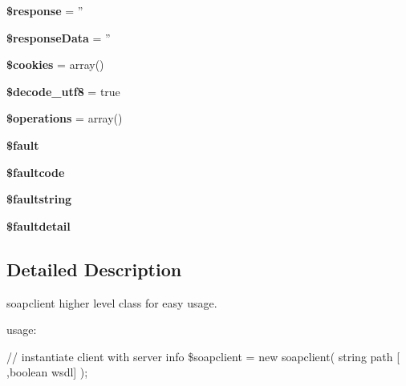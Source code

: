 \begin{DoxyCompactItemize}
\item 
\hypertarget{classsoapclient_af4b6fb1bbc77ccc05f10da3b16935b99}{{\bfseries \$response} = ''}\label{classsoapclient_af4b6fb1bbc77ccc05f10da3b16935b99}

\item 
\hypertarget{classsoapclient_ab1e953a498fa4370be7a8806cea56031}{{\bfseries \$response\-Data} = ''}\label{classsoapclient_ab1e953a498fa4370be7a8806cea56031}

\item 
\hypertarget{classsoapclient_aef9f7eafd54f6e36423347bed723c67e}{{\bfseries \$cookies} = array()}\label{classsoapclient_aef9f7eafd54f6e36423347bed723c67e}

\item 
\hypertarget{classsoapclient_a15fe586a802bc22337e3fe874d6da038}{{\bfseries \$decode\-\_\-utf8} = true}\label{classsoapclient_a15fe586a802bc22337e3fe874d6da038}

\item 
\hypertarget{classsoapclient_a3f662373ff81db09eed5649d07f1931c}{{\bfseries \$operations} = array()}\label{classsoapclient_a3f662373ff81db09eed5649d07f1931c}

\item 
\hypertarget{classsoapclient_a365691ed834f59a9a513180136e7a847}{{\bfseries \$fault}}\label{classsoapclient_a365691ed834f59a9a513180136e7a847}

\item 
\hypertarget{classsoapclient_a07e7ee58f39f98cdd8b2bd2b40ff72d7}{{\bfseries \$faultcode}}\label{classsoapclient_a07e7ee58f39f98cdd8b2bd2b40ff72d7}

\item 
\hypertarget{classsoapclient_acc1a7d86f9bd39e5717add56fbcdfaaa}{{\bfseries \$faultstring}}\label{classsoapclient_acc1a7d86f9bd39e5717add56fbcdfaaa}

\item 
\hypertarget{classsoapclient_a7683364ae0ad0e22863a0f20f0626453}{{\bfseries \$faultdetail}}\label{classsoapclient_a7683364ae0ad0e22863a0f20f0626453}

\end{DoxyCompactItemize}


\subsection{Detailed Description}
soapclient higher level class for easy usage.

usage\-:

// instantiate client with server info \$soapclient = new soapclient( string path \mbox{[} ,boolean wsdl\mbox{]} );

